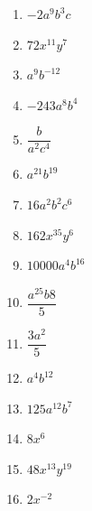 %
%
  \begin{enumerate}[cols=4]
    \item $-2a^9b^3c$
    \item $72x^{11}y^7$
    \item $a^9b^{-12}$
    \item $-243 a^8 b^4$
    \item $\dfrac{b}{a^2c^4}$
    \item $a^{21}b^{19}$
    \item $16a^2b^2c^6$
    \item $162x^{35}y^6$
    \item $\num{10000}a^4b^{16}$
    \item $\dfrac{a^{25}b8}{5}$
    \item $\dfrac{3a^2}{5}$
    \item $a^4b^{12}$
    \item $125a^{12}b^{7}$
    \item $8x^6$
    \item $48x^{13}y^{19}$
    \item $2x^{-2}$
  \end{enumerate}
